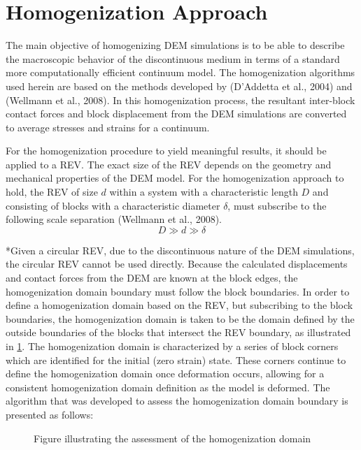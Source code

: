 \section{Homogenization Approach}
The main objective of homogenizing DEM simulations is to be able to describe the macroscopic behavior of the discontinuous medium in terms of a standard more computationally efficient continuum model. The homogenization algorithms used herein are based on the methods developed by (D’Addetta et al., 2004) and (Wellmann et al., 2008). In this homogenization process, the resultant inter-block contact forces and block displacement from the DEM simulations are converted to average stresses and strains for a continuum.

For the homogenization procedure to yield meaningful results, it should be applied to a REV. The exact size of the REV depends on the geometry and mechanical properties of the DEM model. For the homogenization approach to hold, the REV of size $d$ within a system with a characteristic length $D$ and consisting of blocks with a characteristic diameter $\delta$, must subscribe to the following scale separation (Wellmann et al., 2008).
\begin{equation}
\label{eqn:hom1a}
D \gg d \gg \delta
\end{equation}


*Given a circular REV, due to the discontinuous nature of the DEM simulations, the circular REV cannot be used directly. Because the calculated displacements and contact forces from the DEM are known at the block edges, the homogenization domain boundary must follow the block boundaries. In order to define a homogenization domain based on the REV, but subscribing to the block boundaries, the homogenization domain is taken to be the domain defined by the outside boundaries of the blocks that intersect the REV boundary, as illustrated in \ref{fig:vorDFN}. The homogenization domain is characterized by a series of block corners which are identified for the initial (zero strain) state. These corners continue to define the homogenization domain once deformation occurs, allowing for a consistent homogenization domain definition as the model is deformed. The algorithm that was developed to assess the homogenization domain boundary is presented as follows:
\begin{figure}
	\label{fig:vorDFN}
	\caption{Figure illustrating the assessment of the homogenization domain}
\end{figure}

